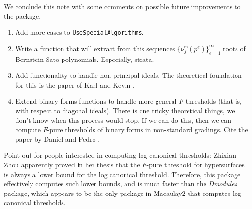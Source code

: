 \documentclass{amsart}
\newcommand{\idealm}{\mathfrak{m}}
\begin{document}
We conclude this note with some comments on possible future improvements to the package.  

\begin{enumerate}
\item Add more cases to {\tt UseSpecialAlgorithms}.  
\item Write a function that will extract from this sequences $\{ \nu_f^{\idealm}(p^e) \}_{e=1}^{\infty}$ roots of Bernstein-Sato polynomials.  Especially, strata.
\item  Add functionality to handle non-principal ideals.  The theoretical foundation for this is the paper of Karl and Kevin \cite{SchwedeTuckerTestIdealsOfNonPrincipal}.
\item Extend binary forms functions to handle more general $F$-thresholds (that is, with respect to diagonal ideals).  There is one tricky theoretical things, we don't know when this process would stop.  If we can do this, then we can compute $F$-pure thresholds of binary forms in non-standard gradings.  Cite the paper by Daniel and Pedro \cite{HernandezTeixeiraFThresholdFunctions}.
\end{enumerate}

{\color{red}  Point out for people interested in computing log canonical thresholds:  Zhixian Zhou apparently proved in her thesis that the $F$-pure threshold for hypersurfaces is always a lower bound for the log canonical threshold.  Therefore, this package effectively computes such lower bounds, and is much faster than the \emph{Dmodules} package, which appears to be the only package in Macaulay2 that computes log canonical thresholds.}



\end{document}
